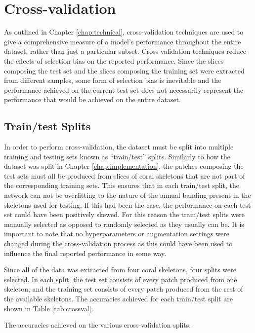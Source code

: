 \section{Cross-validation}
\label{sec:evalcrossval}

As outlined in Chapter \ref{chap:technical}, cross-validation techniques are used to give a comprehensive measure of a model's performance throughout the entire dataset, rather than just a particular subset. Cross-validation techniques reduce the effects of selection bias on the reported performance. Since the slices composing the test set and the slices composing the training set were extracted from different samples, some form of selection bias is inevitable and the performance achieved on the current test set does not necessarily represent the performance that would be achieved on the entire dataset.

\subsection{Train/test Splits}

In order to perform cross-validation, the dataset must be split into multiple training and testing sets known as ``train/test'' splits. Similarly to how the dataset was split in Chapter \ref{chap:implementation}, the patches composing the test sets must all be produced from slices of coral skeletons that are not part of the corresponding training sets. This ensures that in each train/test split, the network can not be overfitting to the nature of the annual banding present in the skeletons used for testing. If this had been the case, the performance on each test set could have been positively skewed. For this reason the train/test splits were manually selected as opposed to randomly selected as they usually can be. It is important to note that no hyperparameters or augmentation settings were changed during the cross-validation process as this could have been used to influence the final reported performance in some way.

Since all of the data was extracted from four coral skeletons, four splits were selected. In each split, the test set consists of every patch produced from one skeleton, and the training set consists of every patch produced from the rest of the available skeletons. The accuracies achieved for each train/test split are shown in Table \ref{tab:crossval}.

\begin{table}[!t]
    \centering
    \caption{The accuracies achieved on the various cross-validation splits.}
    
    \label{tab:crossval}
\end{table}

